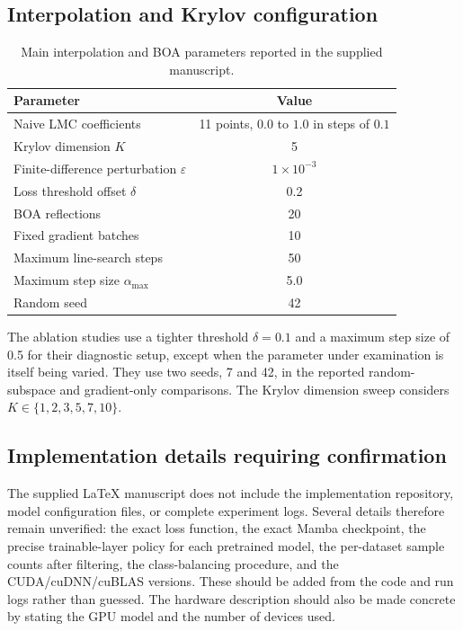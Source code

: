 \documentclass[11pt,a4paper]{article}
\begin{document}
\subsection{Interpolation and Krylov configuration}
\begin{table}[H]
\centering
\caption{Main interpolation and BOA parameters reported in the supplied manuscript.}
\label{tab:hyperparameters}
\begin{tabular}{lc}
\toprule
Parameter & Value \\
\midrule
Naive LMC coefficients & 11 points, $0.0$ to $1.0$ in steps of $0.1$ \\
Krylov dimension $K$ & 5 \\
Finite-difference perturbation $\varepsilon$ & $1\times10^{-3}$ \\
Loss threshold offset $\delta$ & 0.2 \\
BOA reflections & 20 \\
Fixed gradient batches & 10 \\
Maximum line-search steps & 50 \\
Maximum step size $\alpha_{\max}$ & 5.0 \\
Random seed & 42 \\
\bottomrule
\end{tabular}
\end{table}

The ablation studies use a tighter threshold $\delta=0.1$ and a maximum step size of 0.5 for their diagnostic setup, except when the parameter under examination is itself being varied. They use two seeds, 7 and 42, in the reported random-subspace and gradient-only comparisons. The Krylov dimension sweep considers $K\in\{1,2,3,5,7,10\}$.

\subsection{Implementation details requiring confirmation}
The supplied LaTeX manuscript does not include the implementation repository, model configuration files, or complete experiment logs. Several details therefore remain unverified: the exact loss function, the exact Mamba checkpoint, the precise trainable-layer policy for each pretrained model, the per-dataset sample counts after filtering, the class-balancing procedure, and the CUDA/cuDNN/cuBLAS versions. These should be added from the code and run logs rather than guessed. The hardware description should also be made concrete by stating the GPU model and the number of devices used.
\end{document}
